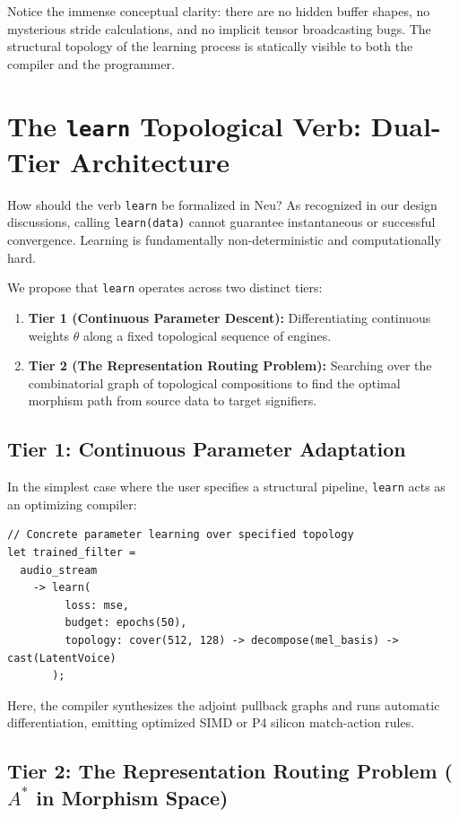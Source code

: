 \documentclass[11pt]{article}
\begin{document}
Notice the immense conceptual clarity: there are no hidden buffer shapes, no mysterious stride calculations, and no implicit tensor broadcasting bugs. The structural topology of the learning process is statically visible to both the compiler and the programmer.

\section{The \texttt{learn} Topological Verb: Dual-Tier Architecture}

How should the verb \texttt{learn} be formalized in Neu? As recognized in our design discussions, calling \texttt{learn(data)} cannot guarantee instantaneous or successful convergence. Learning is fundamentally non-deterministic and computationally hard.

We propose that \texttt{learn} operates across two distinct tiers:
\begin{enumerate}
    \item \textbf{Tier 1 (Continuous Parameter Descent):} Differentiating continuous weights $\theta$ along a fixed topological sequence of engines.
    \item \textbf{Tier 2 (The Representation Routing Problem):} Searching over the combinatorial graph of topological compositions to find the optimal morphism path from source data to target signifiers.
\end{enumerate}

\subsection{Tier 1: Continuous Parameter Adaptation}
In the simplest case where the user specifies a structural pipeline, \texttt{learn} acts as an optimizing compiler:
\begin{lstlisting}[language=neu]
// Concrete parameter learning over specified topology
let trained_filter = 
  audio_stream 
    -> learn(
         loss: mse, 
         budget: epochs(50), 
         topology: cover(512, 128) -> decompose(mel_basis) -> cast(LatentVoice)
       );
\end{lstlisting}
Here, the compiler synthesizes the adjoint pullback graphs and runs automatic differentiation, emitting optimized SIMD or P4 silicon match-action rules.

\subsection{Tier 2: The Representation Routing Problem (\texorpdfstring{$A^*$}{A*} in Morphism Space)}
\label{sec:representation_routing}
\end{document}
